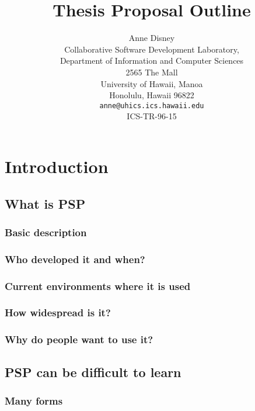 



\title{Thesis Proposal Outline}
\author{Anne Disney\\
Collaborative Software Development Laboratory,\\
Department of Information and Computer Sciences\\
2565 The Mall\\
University of Hawaii, Manoa\\
Honolulu, Hawaii   96822\\
{\tt anne@uhics.ics.hawaii.edu}\\
ICS-TR-96-15}
\maketitle

\tableofcontents
\chapter{Introduction}
\section{What is PSP}
\subsection{Basic description}
\subsection{Who developed it and when?}
\subsection{Current environments where it is used}
\subsection{How widespread is it?}
\subsection{Why do people want to use it?}
\section{PSP can be difficult to learn}
\subsection{Many forms}
